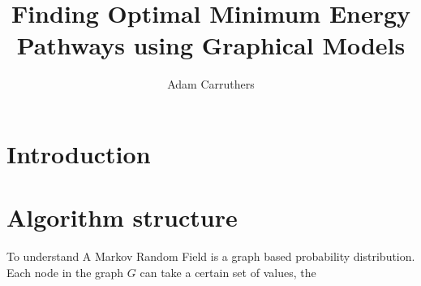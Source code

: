 \documentclass[11pt]{report}
\title{Finding Optimal Minimum Energy Pathways using Graphical Models}
\author{Adam Carruthers}
\begin{document}
    

    \chapter{Introduction}
    \label{ch:into}
    

    \chapter{Algorithm structure}
    \label{ch:algo_struct}
    To understand
    A Markov Random Field is a graph based probability distribution.
    Each node in the graph $G$ can take a certain set of values, the
\end{document}
